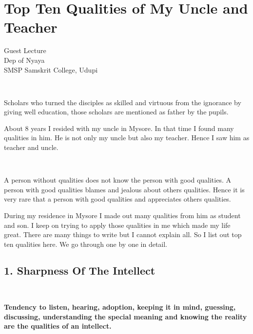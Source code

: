 \chapter{Top Ten Qualities of My Uncle and Teacher}

\begin{center}
\smallskip
Guest Lecture\\
Dep of Nyaya\\
SMSP Samskrit College, Udupi
\addrule
\end{center}

\begin{center}
{\fontsize{15}{17}\selectfont
{}\\
}
\end{center}
Scholars who turned the disciples as skilled and virtuous from the ignorance by giving well education, those scholars are mentioned as father by the pupils.

About 8 years I resided with my uncle in Mysore. In that time I found many qualities in him. He is not only my uncle but also my teacher. Hence I saw him as teacher and uncle.
\begin{center}
{\fontsize{15}{17}\selectfont
{}\\
}
\end{center}
A person without qualities does not know the person with good qualities. A person with good qualities blames and jealous about others qualities. Hence it is very rare that a person with good qualities and appreciates others qualities.

During my residence in Mysore I made out many qualities from him as student and son. I keep on trying to apply those qualities in me which made my life great. There are many things to write but I cannot explain all. So I list out top ten qualities here. We go through one by one in detail.

\section*{1. Sharpness Of The Intellect }

\begin{center}
{\fontsize{15}{17}\selectfont
{}\\
}
\end{center}
\textbf{Tendency to listen, hearing, adoption, keeping it in mind, guessing, discussing, understanding the special meaning and knowing the reality are the qualities of an intellect.}

